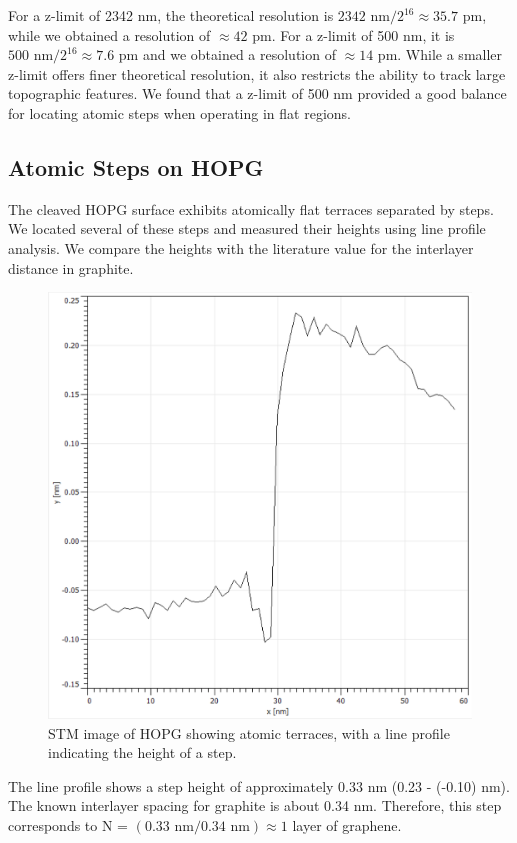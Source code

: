 \documentclass[12pt,a4paper]{article}
\begin{document}
For a z-limit of 2342 nm, the theoretical resolution is \(2342 \text{ nm} / 2^{16} \approx 35.7 \text{ pm}\), while we obtained a resolution of \(\approx 42 \text{ pm}\). For a z-limit of 500 nm, it is \(500 \text{ nm} / 2^{16} \approx 7.6 \text{ pm}\) and we obtained a resolution of \(\approx 14 \text{ pm}\). While a smaller z-limit offers finer theoretical resolution, it also restricts the ability to track large topographic features. We found that a z-limit of 500 nm provided a good balance for locating atomic steps when operating in flat regions.

\subsection{Atomic Steps on HOPG}
The cleaved HOPG surface exhibits atomically flat terraces separated by steps. We located several of these steps and measured their heights using line profile analysis. We compare the heights with the literature value for the interlayer distance in graphite.

\begin{figure}[H]
    \centering
    \includegraphics[width=0.7\linewidth]{../data/tasks/2/graph.PNG}
    \caption{STM image of HOPG showing atomic terraces, with a line profile indicating the height of a step.}
    \label{fig:step}
\end{figure}
The line profile shows a step height of approximately 0.33 nm (0.23 - (-0.10) nm). The known interlayer spacing for graphite is about 0.34 nm. Therefore, this step corresponds to N = $(0.33 \text{ nm} / 0.34 \text{ nm}) \approx 1$ layer of graphene.
\end{document}
